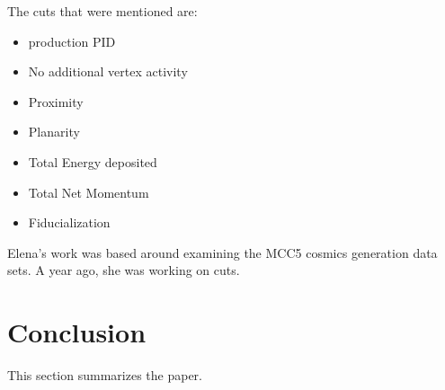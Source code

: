 \documentclass[journal, a4paper]{IEEEtran}
\begin{document}
		The cuts that were mentioned are:
		
		\begin{itemize}
			\item production PID
			\item No additional vertex activity
			\item Proximity
			\item Planarity
			\item Total Energy deposited
			\item Total Net Momentum
			\item Fiducialization
		\end{itemize}
		
		Elena's work was based around examining the MCC5 cosmics generation data sets.
		A year ago, she was working on cuts.	
	
	\section{Conclusion}
	This section summarizes the paper.
	\printbibliography 
\end{document}
